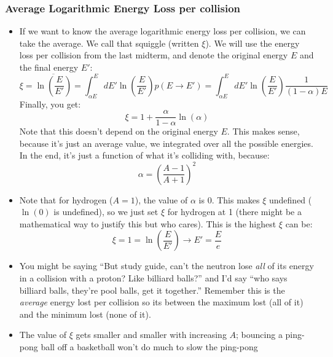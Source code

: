\documentclass[letter]{article}
\begin{document}
\subsubsection{Average Logarithmic Energy Loss per collision}

\begin{itemize}

\item If we want to know the average logarithmic energy loss per
  collision, we can take the average. We call that squiggle (written
  $\xi$). We will use the energy loss per collision from the last
  midterm, and denote the original energy $E$ and the final energy
  $E'$:
  \begin{equation*}
    \xi = \overline{\ln\left(\frac{E}{E'}\right)} =
    \int^E_{\alpha{}E}dE'\ln\left(\frac{E}{E'}\right)p(E\to{}E') = \int^E_{\alpha{}E}dE'\ln\left(\frac{E}{E'}\right)\frac{1}{(1-\alpha)E}
  \end{equation*}
Finally, you get:
\begin{equation*}
  \xi = 1+\frac{\alpha}{1-\alpha}\ln(\alpha)
\end{equation*}
Note that this doesn't depend on the original energy $E$. This makes
sense, because it's just an average value, we integrated over all the
possible energies. In the end, it's just a function of what it's
colliding with, because:
\begin{equation*}
  \alpha = \left(\frac{A-1}{A+1}\right)^2
\end{equation*}
\cite[Lec. 9]{lecture}
\item Note that for hydrogen ($A=1$), the value of $\alpha$ is 0. This
  makes $\xi$ undefined ($\ln(0)$ is undefined), so we just set $\xi$
  for hydrogen at 1 (there might be a mathematical way to justify this
  but who cares). This is the highest $\xi$ can be:
  \begin{equation*}
    \xi = 1 = \ln\left(\frac{E}{E'}\right) \to E'=\frac{E}{e}
  \end{equation*}
\item You might be saying ``But study guide, can't the neutron lose
  \textit{all} of its energy in a collision with a proton? Like
  billiard balls?'' and I'd say ``who says billiard balls, they're
  pool balls, get it together.'' Remember this is the \textit{average} energy lost per
  collision so its between the maximum lost (all of it) and the
  minimum lost (none of it).
\item The value
  of $\xi$ gets smaller and smaller with increasing $A$; bouncing a
  ping-pong ball off a basketball won't do much to slow the ping-pong

\end{itemize}
\end{document}
